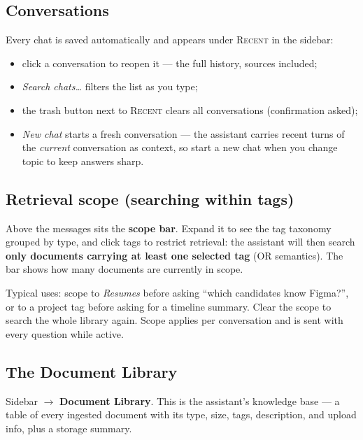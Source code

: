 \documentclass[11pt,letterpaper]{article}
\begin{document}
\subsection{Conversations}

Every chat is saved automatically and appears under \textsc{Recent} in the
sidebar:

\begin{itemize}
  \item click a conversation to reopen it --- the full history, sources
        included;
  \item \emph{Search chats\ldots} filters the list as you type;
  \item the trash button next to \textsc{Recent} clears all conversations
        (confirmation asked);
  \item \emph{New chat} starts a fresh conversation --- the assistant carries
        recent turns of the \emph{current} conversation as context, so start
        a new chat when you change topic to keep answers sharp.
\end{itemize}

\subsection{Retrieval scope (searching within tags)}
\label{sec:scope}

Above the messages sits the \textbf{scope bar}. Expand it to see the tag
taxonomy grouped by type, and click tags to restrict retrieval: the assistant
will then search \textbf{only documents carrying at least one selected tag}
(OR semantics). The bar shows how many documents are currently in scope.

Typical uses: scope to \emph{Resumes} before asking ``which candidates know
Figma?'', or to a project tag before asking for a timeline summary. Clear the
scope to search the whole library again. Scope applies per conversation and
is sent with every question while active.

\subsection{The Document Library}

Sidebar $\rightarrow$ \textbf{Document Library}. This is the assistant's
knowledge base --- a table of every ingested document with its type, size,
tags, description, and upload info, plus a storage summary.
\end{document}
